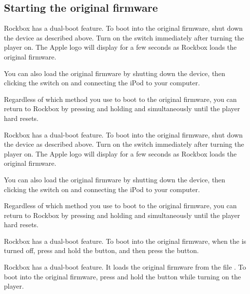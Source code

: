   {
  \subsection{Starting the original firmware}
  \label{ref:Dualboot}
    {
    Rockbox has a dual-boot feature. To boot into the original firmware, shut
    down the device as described above. Turn on the \ButtonHold{} switch
    immediately after turning the player on. The Apple logo will
    display for a few seconds as Rockbox loads the original firmware.
    
    You can also load the original firmware by shutting down the device,
    then clicking the \ButtonHold{} switch on and connecting the iPod
    to your computer.
 
    Regardless of which method you use to boot to the original firmware, you can
    return to Rockbox by pressing and holding \ButtonMenu{} and \ButtonSelect{}
    simultaneously until the player hard resets.
    }

    {
    Rockbox has a dual-boot feature. To boot into the original firmware, shut
    down the device as described above. Turn on the \ButtonHold{} switch
    immediately after turning the player on. The Apple logo will
    display for a few seconds as Rockbox loads the original firmware.
    
    You can also load the original firmware by shutting down the device,
    then clicking the \ButtonHold{} switch on and connecting the iPod
    to your computer.
 
    Regardless of which method you use to boot to the original firmware, you can
    return to Rockbox by pressing and holding \ButtonMenu{} and \ButtonPlay{}
    simultaneously until the player hard resets.
    }

    {
    Rockbox has a dual-boot feature. To boot into the original firmware,
    when the \dap{} is turned off, press and hold the \ButtonRec{} button,
    and then press the \ButtonOn{} button.
    }

    {
    Rockbox has a dual-boot feature. It loads the original firmware from
    the file . To boot into the original firmware,
    press and hold the \ButtonLeft{} button while turning on the player.
    }
    
}
